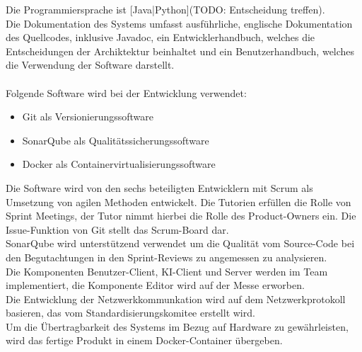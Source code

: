 Die Programmiersprache ist [Java|Python](TODO: Entscheidung treffen).\\
Die Dokumentation des Systems umfasst ausführliche, englische Dokumentation des Quellcodes, inklusive Javadoc, ein Entwicklerhandbuch, welches die Entscheidungen der Archiktektur beinhaltet und ein Benutzerhandbuch, welches die Verwendung der Software darstellt.\\
\\
Folgende Software wird bei der Entwicklung verwendet:
\begin{itemize}
\item Git als Versionierungssoftware
	
\item SonarQube als Qualitätssicherungssoftware
	
\item Docker als Containervirtualisierungssoftware 
\end{itemize}
Die Software wird von den sechs beteiligten Entwicklern mit Scrum als Umsetzung von agilen Methoden entwickelt. Die Tutorien erfüllen die Rolle von Sprint Meetings, der Tutor nimmt hierbei die Rolle des Product-Owners ein. Die Issue-Funktion von Git stellt das Scrum-Board dar.\\
SonarQube wird unterstützend verwendet um die Qualität vom Source-Code bei den Begutachtungen in den Sprint-Reviews zu angemessen zu analysieren.\\
Die Komponenten Benutzer-Client, KI-Client und Server werden im Team implementiert, die Komponente Editor wird auf der Messe erworben.\\
Die Entwicklung der Netzwerkkommunkation wird auf dem Netzwerkprotokoll basieren, das vom Standardisierungskomitee erstellt wird.\\
Um die Übertragbarkeit des Systems im Bezug auf Hardware zu gewährleisten, wird das fertige Produkt in einem Docker-Container übergeben.\\

